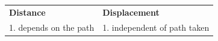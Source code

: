 {{          }{ %
        
    
        \begin{center}
      
      \label{m38788*id63941}
      
    \noindent
      \tablelasttail{}
      \begin{xtabular}[t]{|l|l|}\hline
    
    
        
                  \textbf{ Distance }
                 &
    
    
        
                  \textbf{ Displacement }
     \tabularnewline{}
    
    
        1. depends on the path &
    
    
        1. independent of path taken%
     \tabularnewline{}
    
    

\end{xtabular}
\end{center}}}
